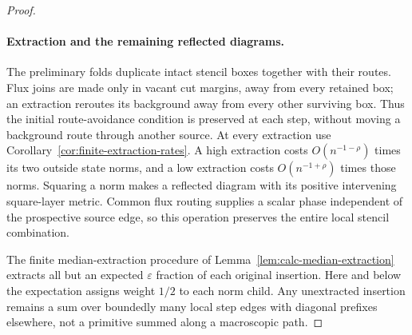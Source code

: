 \begin{proof}
\paragraph{Extraction and the remaining reflected diagrams.}
The preliminary folds
duplicate intact stencil boxes together with their routes.  Flux joins
are made only in vacant cut margins, away from every retained box;
an extraction reroutes its background away from every other surviving
box.  Thus the initial route-avoidance condition is preserved at each
step, without moving a background route through another source.  At
every extraction use
Corollary~\ref{cor:finite-extraction-rates}.  A high extraction costs
$O(n^{-1-\rho})$ times its two outside state norms, and a low
extraction costs $O(n^{-1+\rho})$ times those norms.  Squaring a
norm makes a reflected diagram with its positive intervening
square-layer metric.  Common flux routing supplies a scalar phase
independent of the prospective source edge, so this operation
preserves the entire local stencil combination.

The finite median-extraction procedure of
Lemma~\ref{lem:calc-median-extraction} extracts all but an expected
$\varepsilon$ fraction of each original insertion.  Here and below
the expectation assigns weight $1/2$ to each norm child.  Any
unextracted insertion remains a sum over boundedly many local step
edges with diagonal prefixes elsewhere, not a primitive summed
along a macroscopic path.


\end{proof}
